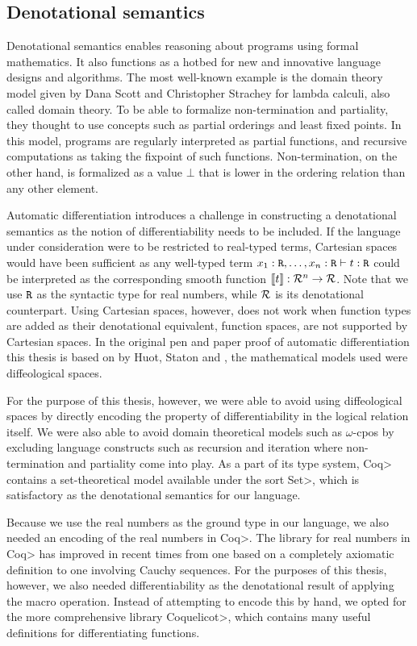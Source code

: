 \subsection{Denotational semantics}
Denotational semantics enables reasoning about programs using formal mathematics.
It also functions as a hotbed for new and innovative language designs and algorithms.
The most well-known example is the domain theory model given by Dana Scott and Christopher Strachey\cite{Scott1977} for lambda calculi, also called domain theory.
To be able to formalize non-termination and partiality, they thought to use concepts such as partial orderings and least fixed points\cite{aaby2020}.
In this model, programs are regularly interpreted as partial functions, and recursive computations as taking the fixpoint of such functions.
Non-termination, on the other hand, is formalized as a value $\bot$ that is lower in the ordering relation than any other element.

Automatic differentiation introduces a challenge in constructing a denotational semantics as the notion of differentiability needs to be included.
If the language under consideration were to be restricted to real-typed terms, Cartesian spaces would have been sufficient as any well-typed term $x_1 : \texttt{R}, \dots, x_n : \texttt{R} \vdash t : \texttt{R}$ could be interpreted as the corresponding smooth function $\llbracket t \rrbracket : \mathcal{R}^n \to \mathcal{R}$.
Note that we use $\texttt{R}$ as the syntactic type for real numbers, while $\mathcal{R}$ is its denotational counterpart.
Using Cartesian spaces, however, does not work when function types are added as their denotational equivalent, function spaces, are not supported by Cartesian spaces\cite{huot2020correctness}.
In the original pen and paper proof of automatic differentiation this thesis is based on by Huot, Staton and \Vakar{}\cite{huot2020correctness}, the mathematical models used were diffeological spaces.

For the purpose of this thesis, however, we were able to avoid using diffeological spaces by directly encoding the property of differentiability in the logical relation itself.
We were also able to avoid domain theoretical models such as $\omega$-cpos by excluding language constructs such as recursion and iteration where non-termination and partiality come into play.
As a part of its type system, \<Coq> contains a set-theoretical model available under the sort \<Set>, which is satisfactory as the denotational semantics for our language.

Because we use the real numbers as the ground type in our language, we also needed an encoding of the real numbers in \<Coq>.
The library for real numbers in \<Coq> has improved in recent times from one based on a completely axiomatic definition to one involving Cauchy sequences.
For the purposes of this thesis, however, we also needed differentiability as the denotational result of applying the macro operation.
Instead of attempting to encode this by hand, we opted for the more comprehensive library \<Coquelicot>\cite{Boldo2015CoquelicotAU}, which contains many useful definitions for differentiating functions.
